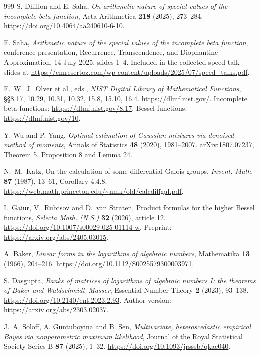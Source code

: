 \documentclass[11pt,a4paper]{article}
\theoremstyle{definition}
\theoremstyle{remark}
\numberwithin{equation}{section}
\begin{document}
\begin{thebibliography}{999}
S. Dhillon and E. Saha,
\emph{On arithmetic nature of special values of the incomplete beta function},
Acta Arithmetica \textbf{218} (2025), 273--284.
\url{https://doi.org/10.4064/aa240610-6-10}.

E. Saha,
\emph{Arithmetic nature of the special values of the incomplete beta function},
conference presentation, Recurrence, Transcendence, and Diophantine
Approximation, 14 July 2025, slides 1--4.
Included in the collected speed-talk slides at
\url{https://emresertoz.com/wp-content/uploads/2025/07/speed_talks.pdf}.

F.~W.~J.~Olver et al., eds., \emph{NIST Digital Library of Mathematical Functions}, \S\S8.17, 10.29, 10.31, 10.32, 15.8, 15.10, 16.4. \url{https://dlmf.nist.gov/}. Incomplete beta functions: \url{https://dlmf.nist.gov/8.17}. Bessel functions: \url{https://dlmf.nist.gov/10}.

Y. Wu and P. Yang,
\emph{Optimal estimation of Gaussian mixtures via denoised method of moments},
Annals of Statistics \textbf{48} (2020), 1981--2007.
\href{https://arxiv.org/pdf/1807.07237}{arXiv:1807.07237},
Theorem 5, Proposition 8 and Lemma 24.

N.~M.~Katz, On the calculation of some differential Galois groups,
\emph{Invent. Math.} \textbf{87} (1987), 13--61, Corollary 4.4.8.
\url{https://web.math.princeton.edu/~nmk/old/calcdiffgal.pdf}.

I.~Gaiur, V.~Rubtsov and D.~van Straten, Product formulas for the
higher Bessel functions, \emph{Selecta Math. (N.S.)} \textbf{32}
(2026), article 12. \url{https://doi.org/10.1007/s00029-025-01114-w}.
Preprint: \url{https://arxiv.org/abs/2405.03015}.

A. Baker,
\emph{Linear forms in the logarithms of algebraic numbers},
Mathematika \textbf{13} (1966), 204--216.
\url{https://doi.org/10.1112/S0025579300003971}.

S. Dasgupta,
\emph{Ranks of matrices of logarithms of algebraic numbers I:
the theorems of Baker and Waldschmidt--Masser},
Essential Number Theory \textbf{2} (2023), 93--138.
\url{https://doi.org/10.2140/ent.2023.2.93}.
Author version: \url{https://arxiv.org/abs/2303.02037}.

J.~A. Soloff, A. Guntuboyina and B. Sen,
\emph{Multivariate, heteroscedastic empirical Bayes via nonparametric
maximum likelihood},
Journal of the Royal Statistical Society Series B \textbf{87} (2025),
1--32. \url{https://doi.org/10.1093/jrsssb/qkae040}.


\end{thebibliography}
\end{document}
